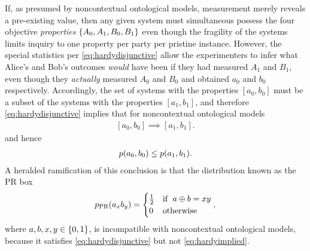 If, as presumed by noncontextual ontological models, measurement merely reveals a pre-existing value, then any given system must simultaneous possess the four objective \emph{properties} $\left\lbrace A_0,A_1,B_0,B_1\right\rbrace$ even though the fragility of the systems limits inquiry to one property per party per pristine instance. However, the special statistics per \cref{eq:hardydisjunctive} allow the experimenters to infer what Alice's and Bob's outcomes \emph{would} have been if they had measured $A_1$ and $B_1$, even though they \emph{actually} measured $A_0$ and $B_0$ and obtained $a_0$ and $b_0$ respectively. Accordingly, the set of systems with the properties $\left[a_0,b_0\right]$ must be a subset of the systems with the properties $\left[a_1,b_1\right]$, and therefore  \cref{eq:hardydisjunctive} implies that for noncontextual ontological models
\begin{align}
\left[a_0,b_0\right] {\scriptstyle \implies} \left[a_1,b_1\right].
\end{align}
and hence
%
\begin{align}\label{eq:hardyimplied}
\p{a_0,b_0} \leq \p{a_1,b_1}.
\end{align}
A heralded ramification of this conclusion is that the distribution known as the PR box~\cite{PROriginal,PRUnit}
\begin{align}\label{eq:PRbox}
p_{\text{PR}}\lparen a_x b_y\rparen=\begin{cases}\tfrac{1}{2}&\text{if }\; a\oplus b= x y \\ 0&\text{otherwise}\end{cases},
\end{align}
where $a,b,x,y\in\left\lbrace0,1\right\rbrace$,
is incompatible with noncontextual ontological models, because it satisfies \cref{eq:hardydisjunctive} but not \cref{eq:hardyimplied}. 

